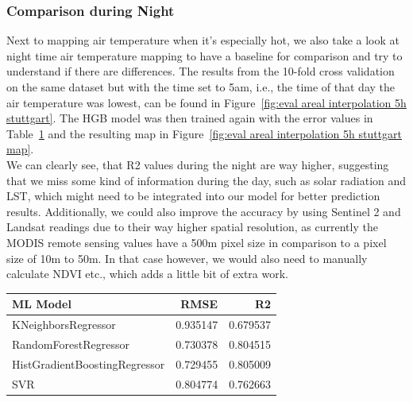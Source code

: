 \subsubsection{Comparison during Night}

Next to mapping air temperature when it's especially hot, we also take a look at night time air temperature mapping to have a baseline for comparison and try to understand if there are differences. The results from the 10-fold cross validation on the same dataset but with the time set to 5am, i.e., the time of that day the air temperature was lowest, can be found in Figure~\ref{fig:eval areal interpolation 5h stuttgart}. The HGB model was then trained again with the error values in Table~\ref{tab: eval night time 5h stuttgart} and the resulting map in Figure~\ref{fig:eval areal interpolation 5h stuttgart map}.\\
We can clearly see, that R2 values during the night are way higher, suggesting that we miss some kind of information during the day, such as solar radiation and LST, which might need to be integrated into our model for better prediction results. Additionally, we could also improve the accuracy by using Sentinel 2 and Landsat readings due to their way higher spatial resolution, as currently the MODIS remote sensing values have a 500m pixel size in comparison to a pixel size of 10m to 50m. In that case however, we would also need to manually calculate NDVI etc., which adds a little bit of extra work.

\begin{table}[ht]
  \centering
  \begin{tabular}{lrr}
  \toprule
                      ML Model &     RMSE &       R2 \\
  \midrule
            KNeighborsRegressor & 0.935147 & 0.679537 \\
          RandomForestRegressor & 0.730378 & 0.804515 \\
  HistGradientBoostingRegressor & 0.729455 & 0.805009 \\
                            SVR & 0.804774 & 0.762663 \\
  \bottomrule
  \end{tabular}
  \label{tab: eval night time 5h stuttgart}
\end{table}

